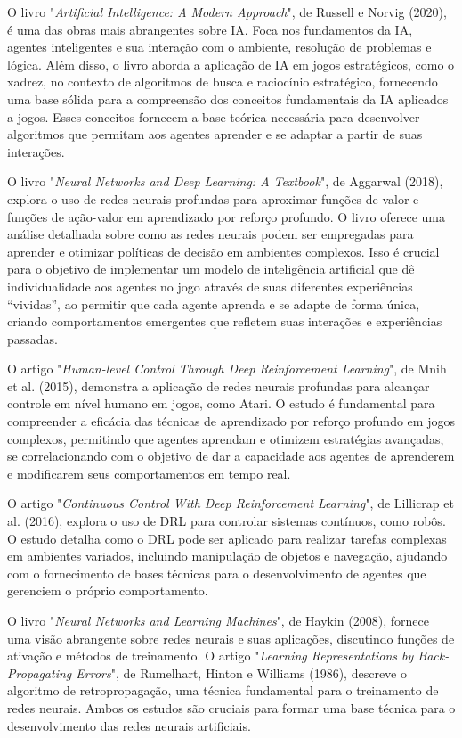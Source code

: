 O livro "\textit{Artificial Intelligence: A Modern Approach}", de Russell e Norvig (2020), é uma das obras mais abrangentes sobre IA. Foca nos fundamentos da IA, agentes inteligentes e sua interação com o ambiente, resolução de problemas e lógica. Além disso, o livro aborda a aplicação de IA em jogos estratégicos, como o xadrez, no contexto de algoritmos de busca e raciocínio estratégico, fornecendo uma base sólida para a compreensão dos conceitos fundamentais da IA aplicados a jogos. Esses conceitos fornecem a base teórica necessária para desenvolver algoritmos que permitam aos agentes aprender e se adaptar a partir de suas interações.

O livro "\textit{Neural Networks and Deep Learning: A Textbook}", de Aggarwal (2018), explora o uso de redes neurais profundas para aproximar funções de valor e funções de ação-valor em aprendizado por reforço profundo. O livro oferece uma análise detalhada sobre como as redes neurais podem ser empregadas para aprender e otimizar políticas de decisão em ambientes complexos. Isso é crucial para o objetivo de implementar um modelo de inteligência artificial que dê individualidade aos agentes no jogo através de suas diferentes experiências “vividas”, ao permitir que cada agente aprenda e se adapte de forma única, criando comportamentos emergentes que refletem suas interações e experiências passadas.

O artigo "\textit{Human-level Control Through Deep Reinforcement Learning}", de Mnih et al. (2015), demonstra a aplicação de redes neurais profundas para alcançar controle em nível humano em jogos, como Atari. O estudo é fundamental para compreender a eficácia das técnicas de aprendizado por reforço profundo em jogos complexos, permitindo que agentes aprendam e otimizem estratégias avançadas, se correlacionando com o objetivo de dar a capacidade aos agentes de aprenderem e modificarem seus comportamentos em tempo real.

O artigo "\textit{Continuous Control With Deep Reinforcement Learning}", de Lillicrap et al. (2016), explora o uso de DRL para controlar sistemas contínuos, como robôs. O estudo detalha como o DRL pode ser aplicado para realizar tarefas complexas em ambientes variados, incluindo manipulação de objetos e navegação, ajudando com o fornecimento de bases técnicas para o desenvolvimento de agentes que gerenciem o próprio comportamento.

O livro "\textit{Neural Networks and Learning Machines}", de Haykin (2008), fornece uma visão abrangente sobre redes neurais e suas aplicações, discutindo funções de ativação e métodos de treinamento. O artigo "\textit{Learning Representations by Back-Propagating Errors}", de Rumelhart, Hinton e Williams (1986), descreve o algoritmo de retropropagação, uma técnica fundamental para o treinamento de redes neurais. Ambos os estudos são cruciais para formar uma base técnica para o desenvolvimento das redes neurais artificiais.

